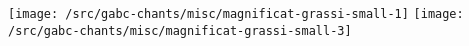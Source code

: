 \texttt{[image: /src/gabc-chants/misc/magnificat-grassi-small-1]}%
\ifx\betweenLilyPondSystem \undefined
  \linebreak
\else
  \expandafter{}%
\fi
\texttt{[image: /src/gabc-chants/misc/magnificat-grassi-small-3]}%
